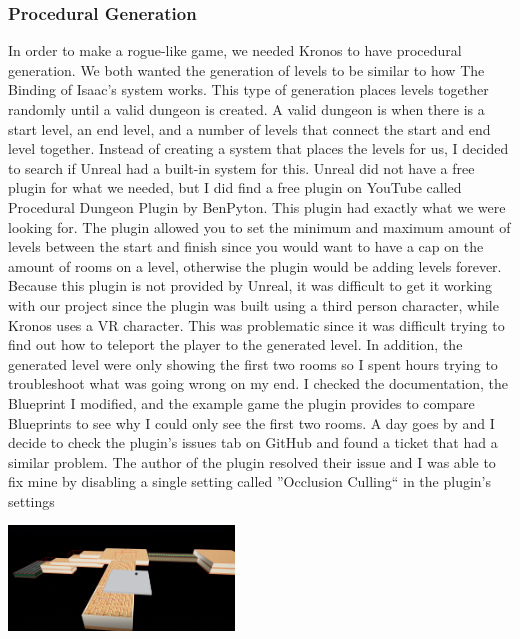 \documentclass{sigchi}
\begin{document}
\subsubsection*{Procedural Generation}
In order to make a rogue-like game, we needed Kronos to have procedural generation. We both wanted the generation of levels to be similar to how The Binding of Isaac's system works. This type of generation places levels together randomly until a valid dungeon is created. A valid dungeon is when there is a start level, an end level, and a number of levels that connect the start and end level together. Instead of creating a system that places the levels for us, I decided to search if Unreal had a built-in system for this. Unreal did not have a free plugin for what we needed, but I did find a free plugin on YouTube called Procedural Dungeon Plugin by BenPyton. This plugin had exactly what we were looking for. The plugin allowed you to set the minimum and maximum amount of levels between the start and finish since you would want to have a cap on the amount of rooms on a level, otherwise the plugin would be adding levels forever. Because this plugin is not provided by Unreal, it was difficult to get it working with our project since the plugin was built using a third person character, while Kronos uses a VR character. This was problematic since it was difficult trying to find out how to teleport the player to the generated level. In addition, the generated level were only showing the first two rooms so I spent hours trying to troubleshoot what was going wrong on my end. I checked the documentation, the Blueprint I modified, and the example game the plugin provides to compare Blueprints to see why I could only see the first two rooms. A day goes by and I decide to check the plugin's issues tab on GitHub and found a ticket that had a similar problem. The author of the plugin resolved their issue and I was able to fix mine by disabling a single setting called ''Occlusion Culling`` in the plugin's settings
\begin{center}
    \includegraphics[width=0.45\textwidth]{dungeon.png}
    \label{fig:Sprites}
\end{center}
\end{document}
